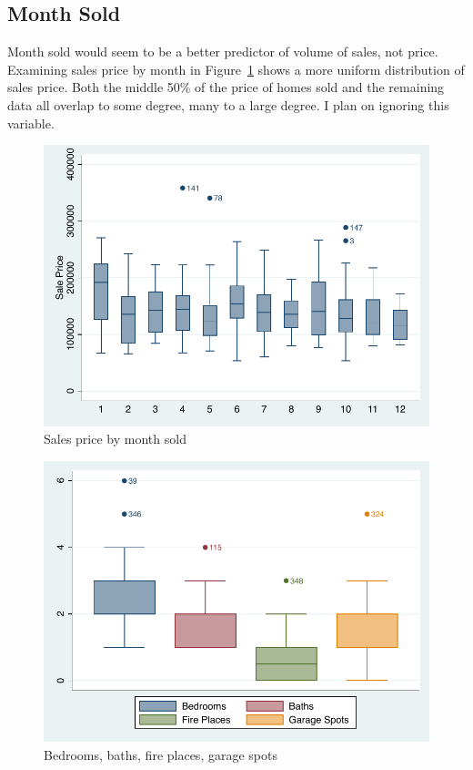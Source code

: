 \documentclass[twocolumn,11pt]{article}
\begin{document}

\subsection*{Month Sold}
Month sold would seem to be a better predictor of volume of sales, not price.
Examining sales price by month in Figure~\ref{fig:uniMonth}
shows a more uniform distribution of sales price.
Both the middle 50\% of the price of homes sold and the remaining data
all overlap to some degree, many to a large degree.
I plan on ignoring this variable.
\begin{figure}[H]
\centering
\includegraphics[width=.9\linewidth]{figures/uniMonth.pdf}
\caption{Sales price by month sold}
\label{fig:uniMonth}
\end{figure}
\begin{figure}[H]
\includegraphics[width=.9\linewidth]{figures/uniCats.pdf}
\caption{Bedrooms, baths, fire places, garage spots}
\label{fig:uniCats}
\end{figure}
\end{document}
